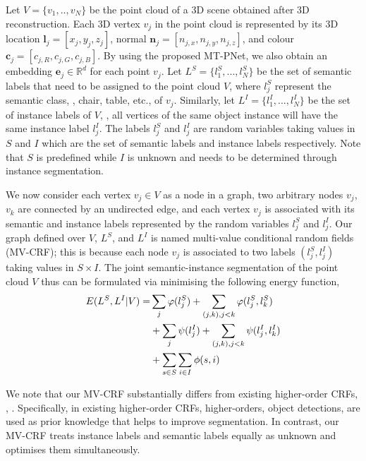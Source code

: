 \documentclass[10pt,twocolumn,letterpaper]{article}
\begin{document}
Let $V=\{v_1,..,v_N\}$ be the point cloud of a 3D scene obtained after 3D
reconstruction. Each 3D vertex $v_j$ in the point cloud is represented by its 3D
location $\mathbf{l}_j=[x_j, y_j, z_j]$, normal
$\mathbf{n}_j = [n_{j,x}, n_{j,y}, n_{j,z}]$, and colour
$\mathbf{c}_j=[c_{j,R}, c_{j,G}, c_{j,B}]$. By using the proposed MT-PNet, we
also obtain an embedding $\mathbf{e}_j \in \mathbb{R}^d$ for each point
$v_j$. Let $L^S=\{l^S_1, ..., l^S_N\}$ be the set of semantic labels that need
to be assigned to the point cloud $V$, where $l^S_j$ represent the semantic
class, \eg, chair, table, etc., of $v_j$. Similarly, let
$L^I=\{l^I_1, ..., l^I_N\}$ be the set of instance labels of $V$, \ie, all
vertices of the same object instance will have the same instance label
$l^I_j$. The labels $l^S_j$ and $l^I_j$ are random variables taking values in
$S$ and $I$ which are the set of semantic labels and instance labels
respectively. Note that $S$ is predefined while $I$ is unknown and needs to be
determined through instance segmentation.

We now consider each vertex $v_j \in V$ as a node in a graph, two arbitrary
nodes $v_j$, $v_k$ are connected by an undirected edge, and each vertex $v_j$ is
associated with its semantic and instance labels represented by the random
variables $l^S_j$ and $l^I_j$. Our graph defined over $V$, $L^S$, and $L^I$ is
named multi-value conditional random fields (MV-CRF); this is because each node
$v_j$ is associated to two labels $(l^S_j, l^I_j)$ taking values in
$S \times I$. The joint semantic-instance segmentation of the point cloud $V$
thus can be formulated via minimising the following energy function,
\begin{align}
  \label{eq:energy}
  E(L^S,L^I|V) = &\sum_{j} \varphi(l^S_j) + \sum_{(j,k),j<k} \varphi(l^S_j, l^S_k) \notag \\
                 &+ \sum_{j} \psi(l^I_j) + \sum_{(j,k),j<k} \psi(l^I_j, l^I_k) \notag \\
                 &+ \sum_{s \in S} \sum_{i \in I} \phi(s,i)
\end{align}

We note that our MV-CRF substantially differs from existing higher-order CRFs,
\eg, \cite{ladicky-what-eccv10, fidler-describing-cvpr12, arnab-hocrf-eccv16,
  pham-rpss-wacv19}. Specifically, in existing higher-order CRFs, higher-orders,
\eg object detections, are used as prior knowledge that helps to improve
segmentation. In contrast, our MV-CRF treats instance labels and semantic labels
equally as unknown and optimises them simultaneously.
\end{document}
